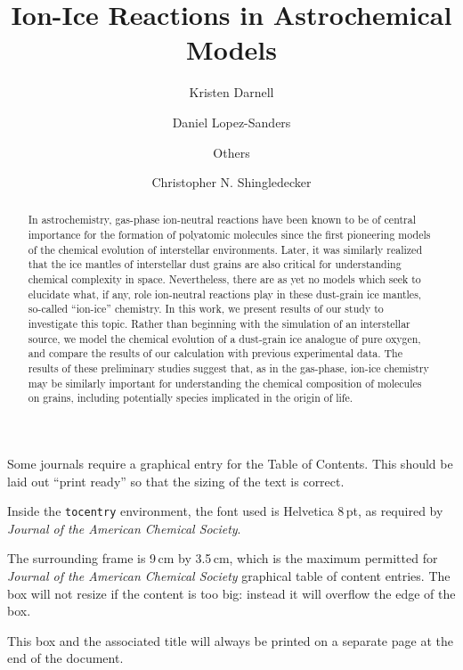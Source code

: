 \documentclass[journal=aesccq,manuscript=draft]{achemso}
\author{Kristen Darnell}
\affiliation[San Jose State University]{Department of Astronomy, San Jose State University, San Jose, California, USA}
\author{Daniel Lopez-Sanders}
\affiliation[Benedictine College]{Department of Physics and Astronomy, Benedictine College, Atchison, KS, USA}
\author{Others}
\author{Christopher N. Shingledecker}
\affiliation[VMI]{Department of Chemistry, Virginia Military Institute, Lexington, VA 24450 USA}
\title[Ion-Ice Reactions in Astrochemistry]
  {Ion-Ice Reactions in Astrochemical Models}
\begin{document}
\begin{tocentry}

Some journals require a graphical entry for the Table of Contents.
This should be laid out ``print ready'' so that the sizing of the
text is correct.

Inside the \texttt{tocentry} environment, the font used is Helvetica
8\,pt, as required by \emph{Journal of the American Chemical
Society}.

The surrounding frame is 9\,cm by 3.5\,cm, which is the maximum
permitted for  \emph{Journal of the American Chemical Society}
graphical table of content entries. The box will not resize if the
content is too big: instead it will overflow the edge of the box.

This box and the associated title will always be printed on a
separate page at the end of the document.

\end{tocentry}

\begin{abstract}
    In astrochemistry, gas-phase ion-neutral reactions have been known to be of 
    central importance for the formation of polyatomic molecules since the first 
    pioneering models of the chemical evolution of interstellar environments. Later,
    it was similarly realized that the ice mantles of interstellar dust grains are
    also critical for understanding chemical complexity in space. Nevertheless, there 
    are as yet no models which seek to elucidate what, if any, role ion-neutral reactions 
    play in these dust-grain ice mantles, so-called ``ion-ice'' chemistry. In this work, we present results of our study to investigate this topic. Rather than beginning with the simulation of
    an interstellar source, we model the chemical evolution of a dust-grain ice analogue of
    pure oxygen, and compare the results of our calculation with previous experimental
    data. The results of these preliminary studies suggest that, as in the gas-phase, 
    ion-ice chemistry may be similarly important for understanding the chemical composition
    of molecules on grains, including potentially species implicated in the origin of life. 
\end{abstract}
\end{document}
